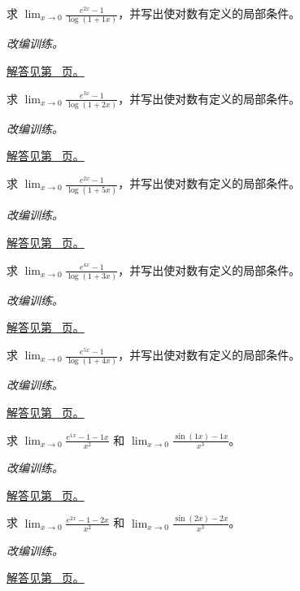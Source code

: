 \documentclass[UTF8,12pt,a4paper,fontset=fandol]{ctexart}
\begin{document}
\begin{example}[对数与指数复合的极限]\label{ex:c3q15}
求 $\displaystyle\lim_{x\to0}\frac{e^{2x}-1}{\log(1+1x)}$，并写出使对数有定义的局部条件。
\par\textit{改编训练。}\par\hyperref[ans:c3q15]{解答见第~\pageref{ans:c3q15} 页。}
\end{example}
\begin{example}[对数与指数复合的极限]\label{ex:c3q16}
求 $\displaystyle\lim_{x\to0}\frac{e^{3x}-1}{\log(1+2x)}$，并写出使对数有定义的局部条件。
\par\textit{改编训练。}\par\hyperref[ans:c3q16]{解答见第~\pageref{ans:c3q16} 页。}
\end{example}
\begin{example}[对数与指数复合的极限]\label{ex:c3q17}
求 $\displaystyle\lim_{x\to0}\frac{e^{2x}-1}{\log(1+5x)}$，并写出使对数有定义的局部条件。
\par\textit{改编训练。}\par\hyperref[ans:c3q17]{解答见第~\pageref{ans:c3q17} 页。}
\end{example}
\begin{example}[对数与指数复合的极限]\label{ex:c3q18}
求 $\displaystyle\lim_{x\to0}\frac{e^{4x}-1}{\log(1+3x)}$，并写出使对数有定义的局部条件。
\par\textit{改编训练。}\par\hyperref[ans:c3q18]{解答见第~\pageref{ans:c3q18} 页。}
\end{example}
\begin{example}[对数与指数复合的极限]\label{ex:c3q19}
求 $\displaystyle\lim_{x\to0}\frac{e^{5x}-1}{\log(1+4x)}$，并写出使对数有定义的局部条件。
\par\textit{改编训练。}\par\hyperref[ans:c3q19]{解答见第~\pageref{ans:c3q19} 页。}
\end{example}
\begin{example}[消去低阶项后的极限]\label{ex:c3q20}
求 $\displaystyle\lim_{x\to0}\frac{e^{1x}-1-1x}{x^2}$ 和 $\displaystyle\lim_{x\to0}\frac{\sin(1x)-1x}{x^3}$。
\par\textit{改编训练。}\par\hyperref[ans:c3q20]{解答见第~\pageref{ans:c3q20} 页。}
\end{example}
\begin{example}[消去低阶项后的极限]\label{ex:c3q21}
求 $\displaystyle\lim_{x\to0}\frac{e^{2x}-1-2x}{x^2}$ 和 $\displaystyle\lim_{x\to0}\frac{\sin(2x)-2x}{x^3}$。
\par\textit{改编训练。}\par\hyperref[ans:c3q21]{解答见第~\pageref{ans:c3q21} 页。}
\end{example}
\end{document}
